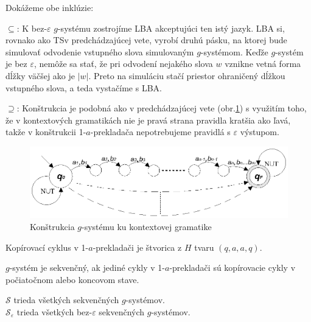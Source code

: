 \begin{dokaz}
Dokážeme obe inklúzie:
\begin{description}
\item{$\subseteq$:} K bez-$\varepsilon$ $g$-systému zostrojíme LBA
akceptujúci ten istý jazyk. LBA si, rovnako ako TS\linebreak v
predchádzajúcej vete, vyrobí druhú pásku, na ktorej bude simulovať
odvodenie vstupného slova simulovaným $g$-systémom. Keďže
$g$-systém je bez $\varepsilon$, nemôže sa stať, že pri odvodení
nejakého slova $w$ vznikne vetná forma dĺžky väčšej ako je $|w|$.
Preto na simuláciu stačí priestor ohraničený dĺžkou vstupného
slova, a teda vystačíme s LBA.
\item{$\supseteq$:} Konštrukcia je podobná ako v predchádzajúcej vete
(obr.\ref{gs_obr_gcs}) s využitím toho, že v kontextových gramatikách nie
je pravá strana pravidla kratšia ako ľavá, takže v konštrukcii
1-$a$-prekladača nepotrebujeme pravidlá s $\varepsilon$ výstupom.
\end{description}
\end{dokaz}

\begin{figure}
\centering
\includegraphics{img/gsystems/cs_g}
\caption{Konštrukcia $g$-systému ku kontextovej gramatike}\label{gs_obr_gcs}
\end{figure}

\begin{definicia}
Kopírovací cyklus v 1-$a$-prekladači je štvorica z $H$ tvaru
$(q,a,a,q)$.
\end{definicia}

\begin{definicia}
$g$-systém je sekvenčný, ak jediné cykly v 1-$a$-prekladači sú
kopírovacie cykly v počiatočnom alebo koncovom stave.
\end{definicia}

\begin{oznacenie}
$\mathcal{S}$ trieda všetkých sekvenčných $g$-systémov.\\
$\mathcal{S}_\varepsilon$ trieda všetkých bez-$\varepsilon$
sekvenčných $g$-systémov.
\end{oznacenie}

